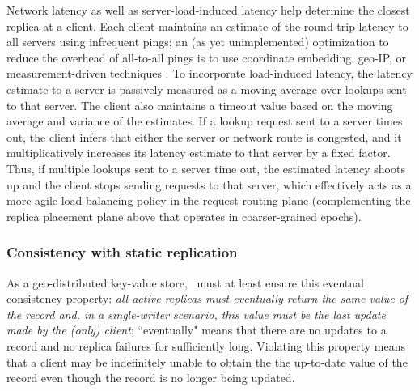 Network latency as well as server-load-induced latency help determine the closest replica at a client. Each client maintains an estimate of the round-trip latency to all servers using infrequent pings; an (as yet unimplemented) optimization to reduce the overhead of all-to-all pings is to use coordinate embedding, geo-IP, or measurement-driven techniques \cite{iplane}. To incorporate load-induced latency, the latency estimate to a server is passively measured as a moving average over lookups sent to that server. The client also maintains a timeout value based on the moving average and variance of the estimates.  If a lookup request sent to a server times out, the client infers that either the server or network route is congested, and it multiplicatively increases its latency estimate to that server by a fixed factor. Thus,  if multiple lookups sent to a server time out, the estimated latency shoots up and the client stops sending requests to that  server, which effectively acts as a more agile load-balancing policy in the request routing plane (complementing the replica placement plane above that operates in coarser-grained epochs).


\subsubsection{Consistency with static replication}
\label{sec:consistency}



As a geo-distributed key-value store, \auspice\ must at least ensure this eventual consistency property: {\em all active replicas must eventually return the same value of the record and, in a single-writer scenario, this value must be the last update made by the (only) client}; ``eventually" means that there are no updates to a record and no replica failures for sufficiently long. Violating this property means that a client may be  indefinitely unable to obtain the the up-to-date value of the record even though the record is no longer being updated. 

